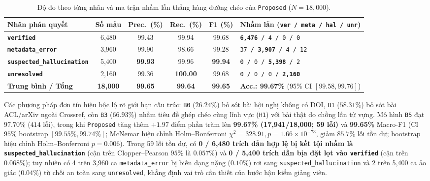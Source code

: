 {\setlength{\tabcolsep}{3.5pt}
\begin{table}[!htbp]
\centering
\caption{Độ đo theo từng nhãn và ma trận nhầm lẫn thẳng hàng đường chéo của \texttt{Proposed} ($N = 18{,}000$).}\label{tab:per-class}
\begin{tabular}{|L{0.25}|C{0.12}|C{0.11}|C{0.11}|C{0.11}|L{0.30}|}
\hline
\textbf{Nhãn phán quyết} & \textbf{Số mẫu} & \textbf{Prec.\ (\%)} & \textbf{Rec.\ (\%)} & \textbf{F1 (\%)} & \textbf{Nhầm lẫn (\texttt{ver / meta / hal / unr})} \\
\hline
\textbf{\texttt{verified}} & 6,480 & 99.43 & 99.94 & 99.68 & \texttt{\textbf{6,476} / 4 / 0 / 0} \\
\hline
\textbf{\texttt{metadata\_error}} & 3,960 & 99.90 & 98.66 & 99.28 & \texttt{37 / \textbf{3,907} / 4 / 12} \\
\hline
\textbf{\texttt{suspected\_hallucination}} & 5,400 & \textbf{99.93} & 99.96 & \textbf{99.94} & \texttt{0 / 0 / \textbf{5,398} / 2} \\
\hline
\textbf{\texttt{unresolved}} & 2,160 & 99.36 & \textbf{100.00} & 99.68 & \texttt{0 / 0 / 0 / \textbf{2,160}} \\
\hline
\textbf{Trung bình / Tổng} & \textbf{18,000} & \textbf{99.65} & \textbf{99.64} & \textbf{99.65} & \textbf{Acc.: 99.67\%} (95\% CI $[99.58, 99.76]$) \\
\hline
\end{tabular}
\end{table}
}

Các phương pháp đơn tín hiệu bộc lộ rõ giới hạn cấu trúc: \texttt{B0} ($26.24\%$) bỏ sót bài hội nghị không có DOI, \texttt{B1} ($58.31\%$) bỏ sót bài ACL/arXiv ngoài Crossref, còn \texttt{B3} ($66.93\%$) nhầm tiêu đề ghép chéo cùng lĩnh vực (\texttt{H1}) với bài thật do chồng lấn từ vựng. Mô hình \texttt{B5} đạt $97.70\%$ ($414$ lỗi), trong khi \texttt{Proposed} tăng thêm $+1.97$ điểm phần trăm lên \textbf{99.67\% (17,941/18,000; 59 lỗi)} và \textbf{99.65\%} Macro-F1 (CI $95\%$ bootstrap $[99.55\%, 99.74\%]$; McNemar hiệu chỉnh Holm--Bonferroni $\chi^2 = 328.91, p = 1.66 \times 10^{-73}$, giảm $85.7\%$ lỗi tồn dư; bootstrap hiệu chỉnh Holm--Bonferroni $p = 0.006$). Trong 59 lỗi tồn dư, có \textbf{0 / 6,480 trích dẫn hợp lệ bị kết tội nhầm là \texttt{suspected\_hallucination}} (cận trên Clopper--Pearson $95\%$ là $0.057\%$) và \textbf{0 / 5,400 trích dẫn bịa đặt lọt vào \texttt{verified}} (cận trên $0.068\%$); tuy nhiên có 4 trên 3,960 ca \texttt{metadata\_error} bị biến dạng nặng ($0.10\%$) rơi sang \texttt{suspected\_hallucination} và 2 trên 5,400 ca ảo giác ($0.04\%$) từ chối an toàn sang \texttt{unresolved}, khẳng định vai trò cần thiết của bước hậu kiểm giảng viên.

